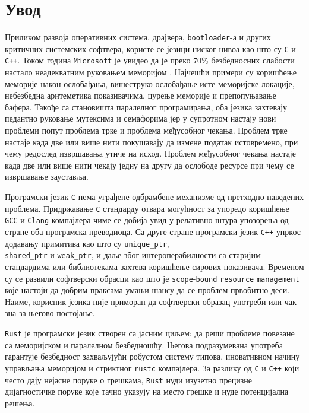 \section{Увод}

Приликом развоја оперативних система, драјвера, \verb|bootloader|-а и других критичних системских софтвера, користе се језици ниског нивоа као што су \verb|C| и \verb|C++|.
Током година \verb|Microsoft| је увидео да је преко 70\% безбедносних слабости настало неадекватним руковањем меморијом \cite{msrc}. Најчешћи примери су коришћење меморије 
након ослобађања, вишеструко ослобађање исте меморијске локације, небезбедна аритеметика показивачима, цурење меморије и препопуњавање бафера.
Такође са становишта паралелног програмирања, оба језика захтевају педантно руковање мутексима и семафорима јер у супротном настају нови проблеми попут 
проблема трке и проблема међусобног чекања. Проблем трке настаје када две или више нити покушавају да измене податак истовремено, при чему редослед извршавања 
утиче на исход. Проблем међусобног чекања настаје када две или више нити чекају једну на другу да ослободе ресурсе при чему се извршавање 
зауставља.

Програмски језик \verb|C| нема уграђене одбрамбене механизме од претходно наведених проблема. Придржавање \verb|C| стандарду отвара могућност за упоредо 
коришћење \verb|GCC| и \verb|Clang| компајлера чиме се добија увид у релативно штура упозорења од стране оба програмска преводиоца.
Са друге стране програмски језик \verb|C++| упркос додавању примитива као што су \verb|unique_ptr|, \\ \verb|shared_ptr| и \verb|weak_ptr|, и даље због интероперабилности 
са старијим стандардима или библиотекама захтева коришћење сирових показивача. Временом су се развили софтверски обрасци као што је \verb|scope|-\verb|bound| \verb|resource| \verb|management|
које настоји да добрим праксама умањи шансу да се проблем првобитно деси. Наиме, корисник језика није приморан да софтверски образац употреби или чак зна 
за његово постојање.

\verb|Rust| је програмски језик створен са јасним циљем: да реши проблеме повезане са меморијском и паралелном безбедношћу. 
Његова подразумевана употреба гарантује безбедност захваљујући робустом систему типова, иновативном начину управљања меморијом и стриктног \verb|rustc| компајлера.
За разлику од \verb|C| и \verb|C++| који често дају нејасне поруке о грешкама, \verb|Rust| нуди изузетно прецизне дијагностичке поруке које тачно указују на место 
грешке и нуде потенцијална решења.

